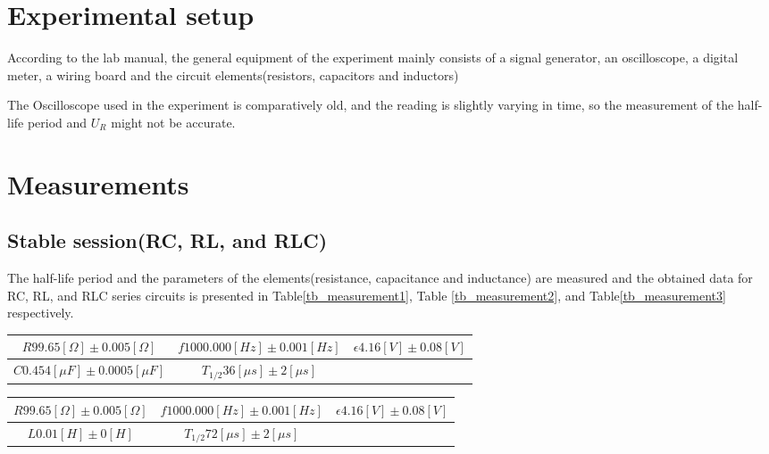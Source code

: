 \documentclass[12pt, a4paper, oneside]{article}
\begin{document}
\section{Experimental setup}

According to the lab manual, the general equipment of the experiment mainly consists of a signal generator, an oscilloscope, a digital meter, a wiring board and the circuit elements(resistors, capacitors and inductors)

The Oscilloscope used in the experiment is comparatively old, and the reading is slightly varying in time, so the measurement of the half-life period and $U_R$ might not be accurate.


\section{Measurements}

\subsection{Stable session(RC, RL, and RLC)}
\label{sec_measurement}

The half-life period and the parameters of the elements(resistance, capacitance and inductance) are measured and the obtained data for RC, RL, and RLC series circuits is presented in Table\ref{tb_measurement1}, Table \ref{tb_measurement2}, and Table\ref{tb_measurement3} respectively.

\begin{table*}[!ht]
  \centering
  \begin{tabular}{|c|c|c|}
    \hline
    $R 99.65 [\Omega]\pm 0.005[\Omega]$ & $f 1000.000 [Hz]\pm 0.001[Hz]$ & $\epsilon 4.16 [V]\pm 0.08[V]$\\ \hline
    $C 0.454 [\mu F]\pm 0.0005[\mu F]$ & $T_{1/2} 36 [\mu s]\pm 2[\mu s]$&\\ \hline
  \end{tabular}
  \caption{Data for the measurement of RC series circuit.}
  \label{tb_measurement1}
\end{table*}

\begin{table*}[!ht]
  \centering
  \begin{tabular}{|c|c|c|}
    \hline
    $R 99.65 [\Omega]\pm 0.005[\Omega]$ & $f 1000.000 [Hz]\pm 0.001[Hz]$ & $\epsilon 4.16 [V]\pm 0.08[V]$\\ \hline
    $L 0.01 [H]\pm 0[H]$ & $T_{1/2} 72 [\mu s]\pm 2[\mu s]$&\\ \hline
  \end{tabular}
  \caption{Data for the measurement of RL series circuit.}
  \label{tb_measurement2}
\end{table*}
\end{document}
